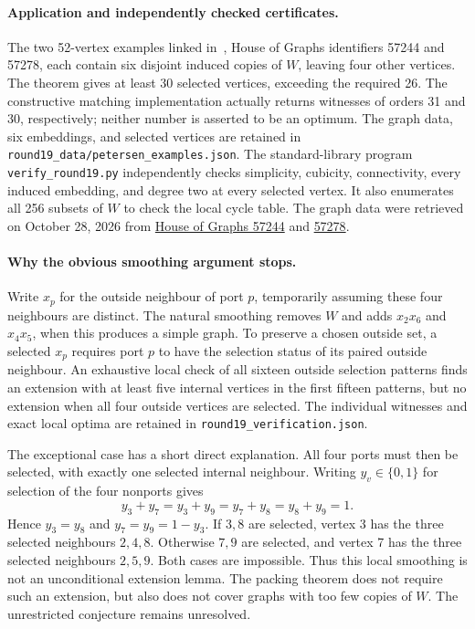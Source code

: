 \documentclass[11pt]{article}
\begin{document}
\paragraph{Application and independently checked certificates.}
The two 52-vertex examples linked in~\cite{GJMMMU}, House of Graphs
identifiers 57244 and 57278, each contain six disjoint induced copies
of $W$, leaving four other vertices. The theorem gives at least
30 selected vertices, exceeding the required 26.
The constructive matching implementation actually returns witnesses
of orders 31 and 30, respectively; neither number is asserted to be
an optimum. The graph data, six embeddings, and selected vertices
are retained in \texttt{round19\_data/petersen\_examples.json}.
The standard-library program \texttt{verify\_round19.py} independently
checks simplicity, cubicity, connectivity, every induced embedding,
and degree two at every selected vertex. It also enumerates all
256 subsets of $W$ to check the local cycle table.
The graph data were retrieved on October 28, 2026 from
\href{https://houseofgraphs.org/graphs/57244}{House of Graphs 57244}
and \href{https://houseofgraphs.org/graphs/57278}{57278}.

\paragraph{Why the obvious smoothing argument stops.}
Write $x_p$ for the outside neighbour of port $p$, temporarily
assuming these four neighbours are distinct. The natural smoothing
removes $W$ and adds $x_2x_6$ and $x_4x_5$, when this produces a simple
graph. To preserve a chosen outside set, a selected $x_p$ requires
port $p$ to have the selection status of its paired outside neighbour.
An exhaustive local check of all sixteen outside selection patterns
finds an extension with at least five internal vertices in the first
fifteen patterns, but no extension when all four outside vertices
are selected. The individual witnesses and exact local optima are
retained in \texttt{round19\_verification.json}.

The exceptional case has a short direct explanation. All four ports
must then be selected, with exactly one selected internal neighbour.
Writing $y_v\in\{0,1\}$ for selection of the four nonports gives
\[
 y_3+y_7=y_3+y_9=y_7+y_8=y_8+y_9=1.
\]
Hence $y_3=y_8$ and $y_7=y_9=1-y_3$. If $3,8$ are selected, vertex
3 has the three selected neighbours $2,4,8$. Otherwise $7,9$ are
selected, and vertex 7 has the three selected neighbours $2,5,9$.
Both cases are impossible. Thus this local smoothing is not an
unconditional extension lemma. The packing theorem does not require
such an extension, but also does not cover graphs with too few copies
of $W$. The unrestricted conjecture remains unresolved.
\end{document}
